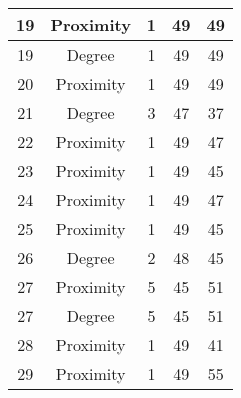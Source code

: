 \documentclass[results.tex]{subfiles}
\begin{document}
\begin{center}
\begin{tabular}{| c || c | c | c | c |}
            \hline
            19                      & Proximity                    & 1                      & 49                      & 49                   \\
            \hline
            19                      & Degree                       & 1                      & 49                      & 49                   \\
            \hline
            20                      & Proximity                    & 1                      & 49                      & 49                   \\
            \hline
            21                      & Degree                       & 3                      & 47                      & 37                   \\
            \hline
            22                      & Proximity                    & 1                      & 49                      & 47                   \\
            \hline
            23                      & Proximity                    & 1                      & 49                      & 45                   \\
            \hline
            24                      & Proximity                    & 1                      & 49                      & 47                   \\
            \hline
            25                      & Proximity                    & 1                      & 49                      & 45                   \\
            \hline
            26                      & Degree                       & 2                      & 48                      & 45                   \\
            \hline
            27                      & Proximity                    & 5                      & 45                      & 51                   \\
            \hline
            27                      & Degree                       & 5                      & 45                      & 51                   \\
            \hline
            28                      & Proximity                    & 1                      & 49                      & 41                   \\
            \hline
            29                      & Proximity                    & 1                      & 49                      & 55                   \\

\end{tabular}
\end{center}
\end{document}
